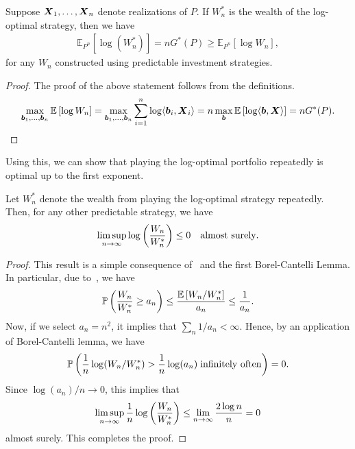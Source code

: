     \begin{proposition}
        \label{prop:iid-stock-market} Suppose $\boldsymbol{X}_1, \ldots, \boldsymbol{X}_n$ denote \iid realizations of $P$. If $W^*_n$ is the wealth of the log-optimal strategy, then we have 
        \begin{align}
            \mathbb{E}_{P^n}[\log(W^*_n)] = n G^*(P) \geq \mathbb{E}_{P^n}[\log W_n], 
        \end{align}
        for any $W_n$ constructed using predictable investment strategies. 
    \end{proposition}
    \begin{proof}
        The proof of the above statement follows from the definitions. 
        \begin{align}
            \max_{\boldsymbol{b}_1, \ldots, \boldsymbol{b}_n} \mathbb{E}\left[ \log W_n \right] = \max_{\boldsymbol{b}_1, \ldots, \boldsymbol{b}_n} \sum_{i=1}^n \log \langle \boldsymbol{b}_i, \boldsymbol{X}_i \rangle  
             = n \max_{\boldsymbol{b}} \mathbb{E}\left[ \log \langle \boldsymbol{b}, \boldsymbol{X} \rangle \right] = nG^*(P). 
        \end{align}
    \end{proof}
    Using this, we can show that playing the log-optimal portfolio repeatedly is optimal up to the first exponent. 
    \begin{proposition}
        \label{prop:log-optimal-first-order} Let $W_n^*$ denote the wealth from playing the log-optimal strategy repeatedly. Then, for any other predictable strategy, we have 
        \begin{align}
            \limsup_{n \to \infty} \log \left( \frac{W_n}{W_n^*} \right) \leq 0 \quad \text{almost surely}. 
        \end{align}
    \end{proposition}
    \begin{proof}
        This result is a simple consequence of~ and the first Borel-Cantelli Lemma. In particular, due to~, we have 
        \begin{align}
            \mathbb{P}\left( \frac{W_n}{W_n^*} \geq a_n \right) \leq \frac{\mathbb{E}\left[ W_n/W_n^* \right]}{a_n} \leq \frac{1}{a_n}. 
        \end{align}
        Now, if we select $a_n=n^2$, it implies that $\sum_{n} 1/a_n < \infty$. Hence, by an application of Borel-Cantelli lemma, we have 
        \begin{align}
            \mathbb{P}\left( \frac{1}{n} \log (W_n/W_n^*) > \frac{1}{n}\log (a_n) \; \text{infinitely often} \right)  = 0. 
        \end{align}
        Since $\log(a_n)/n \to 0$, this implies that 
        \begin{align}
            \limsup_{n \to \infty} \frac{1}{n} \log \left( \frac{W_n}{W_n^*} \right) \leq \lim_{n\to \infty} \frac{2 \log n}{n}  = 0 
        \end{align}
        almost surely. 
        This completes the proof. 
    \end{proof}
